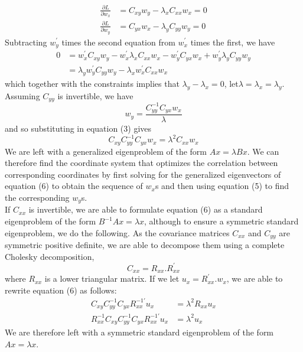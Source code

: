 \documentclass[fleqn,a4paper,12pt]{article}
\begin{document}
\begin{align}
\frac{\partial L}{\partial w_x} &= C_{xy}w_y - \lambda_x C_{xx}w_x = 0 \\
\frac{\partial L}{\partial w_y} &= C_{yx}w_x - \lambda_y C_{yy}w_y = 0
\end{align}
\noindent Subtracting $w_y^{'}$ times the second equation from $w_x^{'}$ times the first, we have
\begin{align*}
0 &= w_x^{'}C_{xy}w_y - w_x^{'}\lambda_x C_{xx}w_x - w_y^{'}C_{yx}w_x 	+ w_y^{'}\lambda_y C_{yy}w_y \\
&= \lambda_y w_y^{'} C_{yy} w_y - \lambda_x w_x^{'} C_{xx} w_x 
\end{align*}
\noindent which together with the constraints implies that $\lambda_y−\lambda_x = 0$, let$ \lambda = \lambda_x = \lambda_y$.
Assuming $C_{yy}$ is invertible, we have
\begin{equation}
 w_y = \frac{C_{yy}^{-1}C_{yx}w_x}{\lambda}
\end{equation}
and so substituting in equation (3) gives
\begin{equation}
C_{xy}C_{yy}^{-1}C_{yx}w_x = \lambda^{2} C_{xx} w_x
\end{equation}
We are left with a generalized eigenproblem of the form $Ax = \lambda Bx$. We can therefore find the coordinate system that optimizes the correlation between corresponding coordinates by first solving for the generalized eigenvectors of equation (6) to obtain the sequence of $w_x$s and then using equation (5) to find the corresponding $w_y$s. \\
\indent If $C_{xx}$ is invertible, we are able to formulate equation (6) as a standard eigenproblem of the form $B^{-1} Ax = \lambda x$, although to ensure a symmetric standard eigenproblem, we do the following. As the covariance matrices $C_{xx}$ and $C_{yy}$ are symmetric positive definite, we are able to decompose them
using a complete Cholesky decomposition,
\begin{equation*}
C_{xx}  = R_{xx}.R_{xx}^{'}
\end{equation*}
where $R_{xx}$ is a lower triangular matrix. If we let $u_x = R_{xx}^{'}.w_x$, we are able
to rewrite equation (6) as follows:
\begin{align*}
C_{xy}C_{yy}^{-1}C_{yx} R_{xx}^{-1'} u_x &= \lambda^{2} R_{xx} u_x \\
R_{xx}^{-1} C_{xy}C_{yy}^{-1}C_{yx} R_{xx}^{-1'} u_x &= \lambda^{2}  u_x
\end{align*}
We are therefore left with a symmetric standard eigenproblem of the form
$Ax = \lambda x$.
\end{document}
